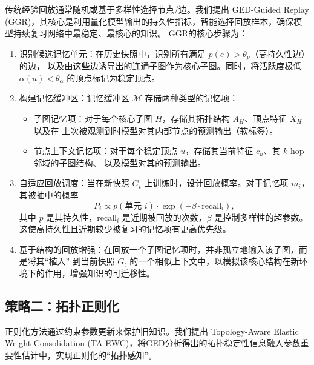 传统经验回放通常随机或基于多样性选择节点/边。我们提出 GED-Guided Replay (GGR)，其核心是利用量化模型输出的持久性指标，智能选择回放样本，确保模型持续复习网络中最稳定、最核心的知识。
GGR的核心步骤为：
\begin{enumerate}[label=\arabic*.]
  \item 识别候选记忆单元：在历史快照中，识别所有满足 $p(e)>\theta_p$（高持久性边）的边，
        以及由这些边诱导出的连通子图作为核心子图。同时，将活跃度极低 $\alpha(u)<\theta_\alpha$ 的顶点标记为稳定顶点。

  \item 构建记忆缓冲区：记忆缓冲区 $\mathcal{M}$ 存储两种类型的记忆项：
        \begin{itemize}[leftmargin=*,nosep]
          \item 子图记忆项：对于每个核心子图 $H$，存储其拓扑结构 $A_H$、顶点特征 $X_H$ 以及在
                上次被观测到时模型对其内部节点的预测输出（软标签）。
          \item 节点上下文记忆项：对于每个稳定顶点 $u$，存储其当前特征 $c_u$、其 $k$-hop 邻域的子图结构、
                以及模型对其的预测输出。
        \end{itemize}

  \item 自适应回放调度：当在新快照 $G_t$ 上训练时，设计回放概率。对于记忆项 $m_i$，其被抽中的概率
        \[
        P_i \propto p(\text{单元 }i)\cdot\exp(-\beta\cdot\mathrm{recall}_i),
        \]
        其中 $p$ 是其持久性，$\mathrm{recall}_i$ 是近期被回放的次数，$\beta$ 是控制多样性的超参数。
        这使高持久性且近期较少被复习的记忆项有更高优先级。

  \item 基于结构的回放增强：在回放一个子图记忆项时，并非孤立地输入该子图，而是将其“植入”
        到当前快照 $G_t$ 的一个相似上下文中，以模拟该核心结构在新环境下的作用，增强知识的可迁移性。
\end{enumerate}

\subsection{策略二：拓扑正则化}

正则化方法通过约束参数更新来保护旧知识。我们提出 Topology-Aware Elastic Weight Consolidation (TA-EWC)，将GED分析得出的拓扑稳定性信息融入参数重要性估计中，实现正则化的“拓扑感知”。

